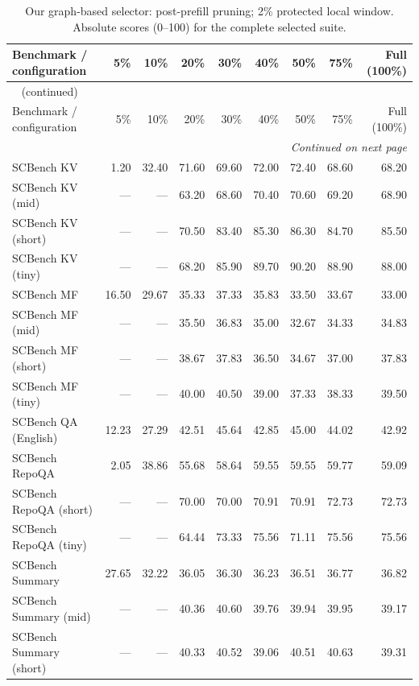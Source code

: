 \begingroup
\small
\setlength{\tabcolsep}{4pt}
\begin{longtable}{@{}lrrrrrrrr@{}}
\caption{Our graph-based selector: post-prefill pruning; 2\% protected local window. Absolute scores (0--100) for the complete selected suite.}
\label{tab:results-graphkv} \\
\hline
Benchmark / configuration & 5\% & 10\% & 20\% & 30\% & 40\% & 50\% & 75\% & Full (100\%) \\
\hline
\endfirsthead
\multicolumn{9}{l}{\tablename\ \thetable{} (continued)} \\
\hline
Benchmark / configuration & 5\% & 10\% & 20\% & 30\% & 40\% & 50\% & 75\% & Full (100\%) \\
\hline
\endhead
\hline
\multicolumn{9}{r}{\emph{Continued on next page}} \\
\endfoot
\hline
\endlastfoot
SCBench KV & 1.20 & 32.40 & 71.60 & 69.60 & 72.00 & 72.40 & 68.60 & 68.20 \\
SCBench KV (mid) & --- & --- & 63.20 & 68.60 & 70.40 & 70.60 & 69.20 & 68.90 \\
SCBench KV (short) & --- & --- & 70.50 & 83.40 & 85.30 & 86.30 & 84.70 & 85.50 \\
SCBench KV (tiny) & --- & --- & 68.20 & 85.90 & 89.70 & 90.20 & 88.90 & 88.00 \\
SCBench MF & 16.50 & 29.67 & 35.33 & 37.33 & 35.83 & 33.50 & 33.67 & 33.00 \\
SCBench MF (mid) & --- & --- & 35.50 & 36.83 & 35.00 & 32.67 & 34.33 & 34.83 \\
SCBench MF (short) & --- & --- & 38.67 & 37.83 & 36.50 & 34.67 & 37.00 & 37.83 \\
SCBench MF (tiny) & --- & --- & 40.00 & 40.50 & 39.00 & 37.33 & 38.33 & 39.50 \\
SCBench QA (English) & 12.23 & 27.29 & 42.51 & 45.64 & 42.85 & 45.00 & 44.02 & 42.92 \\
SCBench RepoQA & 2.05 & 38.86 & 55.68 & 58.64 & 59.55 & 59.55 & 59.77 & 59.09 \\
SCBench RepoQA (short) & --- & --- & 70.00 & 70.00 & 70.91 & 70.91 & 72.73 & 72.73 \\
SCBench RepoQA (tiny) & --- & --- & 64.44 & 73.33 & 75.56 & 71.11 & 75.56 & 75.56 \\
SCBench Summary & 27.65 & 32.22 & 36.05 & 36.30 & 36.23 & 36.51 & 36.77 & 36.82 \\
SCBench Summary (mid) & --- & --- & 40.36 & 40.60 & 39.76 & 39.94 & 39.95 & 39.17 \\
SCBench Summary (short) & --- & --- & 40.33 & 40.52 & 39.06 & 40.51 & 40.63 & 39.31 \\

\end{longtable}
